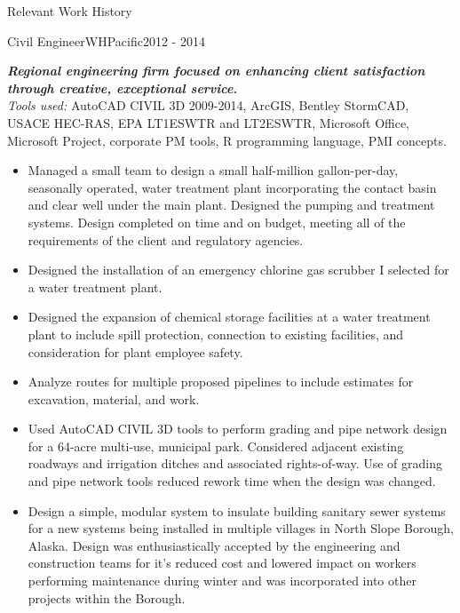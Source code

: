 \documentclass[]{mcdowellcv}
\newcommand{\smallspace}{\vspace{2pt}}
\newcommand{\compDesc}[1]{
	\textbf{\textit{#1}}
	\smallspace\\
}
\newcommand{\tools}[1]{
	\textit{Tools used: }#1
	\smallspace
}
\begin{document}
\begin{cvsection}{Relevant Work History}	
	\begin{cvsubsection}{Civil Engineer}{WHPacific}{2012 - 2014}
		\compDesc{Regional engineering firm focused on enhancing client satisfaction through creative, exceptional service.}
		\tools{AutoCAD CIVIL 3D 2009-2014, ArcGIS, Bentley StormCAD, USACE HEC-RAS, EPA LT1ESWTR and LT2ESWTR, Microsoft Office, Microsoft Project, corporate PM tools, \textsf{R} programming language, PMI concepts.}
		\begin{itemize}
			\item Managed a small team to design a small half-million gallon-per-day, seasonally operated, water treatment plant incorporating the contact basin and clear well under the main plant.  Designed the pumping and treatment systems.  Design completed on time and on budget, meeting all of the requirements of the client and regulatory agencies.

			\smallspace
			\item Designed the installation of an emergency chlorine gas scrubber I selected for a water treatment plant.
			
			\smallspace
			\item Designed the expansion of chemical storage facilities at a water treatment plant to include spill protection, connection to existing facilities, and consideration for plant employee safety.
			
			\smallspace
			\item Analyze routes for multiple proposed pipelines to include estimates for excavation, material, and work.
			
			\smallspace
			\item Used AutoCAD CIVIL 3D tools to perform grading and pipe network design for a 64-acre multi-use, municipal park.  Considered adjacent existing roadways and irrigation ditches and associated rights-of-way.  Use of grading and pipe network tools reduced rework time when the design was changed.
			
			\smallspace
			\item Design a simple, modular system to insulate building sanitary sewer systems for a new systems being installed in multiple villages in North Slope Borough, Alaska.  Design was enthusiastically accepted by the engineering and construction teams for it's reduced cost and lowered impact on workers performing maintenance during winter and was incorporated into other projects within the Borough.
			

\end{itemize}
\end{cvsubsection}
\end{cvsection}
\end{document}

